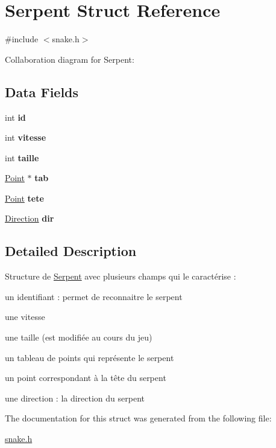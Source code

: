 \hypertarget{struct_serpent}{}\section{Serpent Struct Reference}
\label{struct_serpent}


{\ttfamily \#include $<$snake.\+h$>$}



Collaboration diagram for Serpent\+:
\subsection*{Data Fields}
\begin{DoxyCompactItemize}
\item 
\hypertarget{struct_serpent_a7441ef0865bcb3db9b8064dd7375c1ea}{}int {\bfseries id}\label{struct_serpent_a7441ef0865bcb3db9b8064dd7375c1ea}

\item 
\hypertarget{struct_serpent_a4b512d0a6dcc3c7d7e6dd9a7714852c4}{}int {\bfseries vitesse}\label{struct_serpent_a4b512d0a6dcc3c7d7e6dd9a7714852c4}

\item 
\hypertarget{struct_serpent_a29bf3fc0ffe4e72e45f0c84ab4f8cd1e}{}int {\bfseries taille}\label{struct_serpent_a29bf3fc0ffe4e72e45f0c84ab4f8cd1e}

\item 
\hypertarget{struct_serpent_ad44190bd0d6846f34b2f440d8b028653}{}\hyperlink{struct_point}{Point} $\ast$ {\bfseries tab}\label{struct_serpent_ad44190bd0d6846f34b2f440d8b028653}

\item 
\hypertarget{struct_serpent_a7029c13111e60317aa11bbabd7a6dd66}{}\hyperlink{struct_point}{Point} {\bfseries tete}\label{struct_serpent_a7029c13111e60317aa11bbabd7a6dd66}

\item 
\hypertarget{struct_serpent_a58d94fa8f7ddf189cd6eabdea4f2346c}{}\hyperlink{snake_8h_a224b9163917ac32fc95a60d8c1eec3aa}{Direction} {\bfseries dir}\label{struct_serpent_a58d94fa8f7ddf189cd6eabdea4f2346c}

\end{DoxyCompactItemize}


\subsection{Detailed Description}
Structure de \hyperlink{struct_serpent}{Serpent} avec plusieurs champs qui le caractérise \+:
\begin{DoxyItemize}
\item un identifiant \+: permet de reconnaitre le serpent
\item une vitesse
\item une taille (est modifiée au cours du jeu)
\item un tableau de points qui représente le serpent
\item un point correspondant à la tête du serpent
\item une direction \+: la direction du serpent 
\end{DoxyItemize}

The documentation for this struct was generated from the following file\+:\begin{DoxyCompactItemize}
\item 
\hyperlink{snake_8h}{snake.\+h}\end{DoxyCompactItemize}
